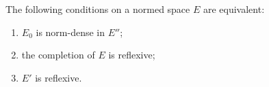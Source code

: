 The following conditions on a normed space $E$ are equivalent:
\begin{enumerate}
\item[(a)] $E_0$ is norm-dense in $E''$;
\item[(b)] the completion of $E$ is reflexive;
\item[(c)] $E'$ is reflexive.
\end{enumerate}
